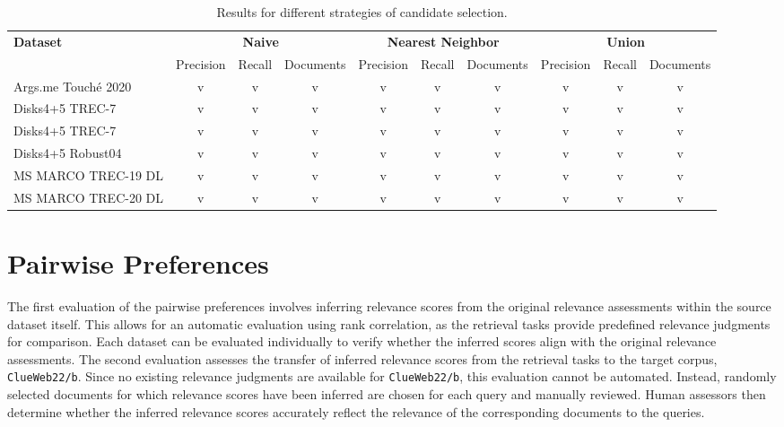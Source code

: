 \begin{sidewaystable}
    \centering
    \footnotesize
    \caption{Results for different strategies of candidate selection.}
    \begin{tabular}{lccccccccc}
        \toprule
        \textbf{Dataset} & \multicolumn{3}{c}{\textbf{Naive}} & \multicolumn{3}{c}{\textbf{Nearest Neighbor}} & \multicolumn{3}{c}{\textbf{Union}} \\
        \cmidrule(lr){2-4} \cmidrule(lr){5-7} \cmidrule(lr){8-10}
                         & Precision & Recall & Documents & Precision & Recall & Documents & Precision & Recall & Documents \\
        \midrule

        Args.me Touché 2020 & v & v & v & v & v & v & v & v & v \\
        Disks4+5 TREC-7     & v & v & v & v & v & v & v & v & v \\
        Disks4+5 TREC-7     & v & v & v & v & v & v & v & v & v \\
        Disks4+5 Robust04   & v & v & v & v & v & v & v & v & v \\
        MS MARCO TREC-19 DL & v & v & v & v & v & v & v & v & v \\
        MS MARCO TREC-20 DL & v & v & v & v & v & v & v & v & v \\

        \bottomrule 
    \end{tabular}
\end{sidewaystable}

\section{Pairwise Preferences}\label{eval-pairwise-preferences}

The first evaluation of the pairwise preferences involves inferring relevance scores from the original relevance assessments within the source dataset itself. This allows for an automatic evaluation using rank correlation, as the retrieval tasks provide predefined relevance judgments for comparison. Each dataset can be evaluated individually to verify whether the inferred scores align with the original relevance assessments. The second evaluation assesses the transfer of inferred relevance scores from the retrieval tasks to the target corpus, \texttt{ClueWeb22/b}. Since no existing relevance judgments are available for \texttt{ClueWeb22/b}, this evaluation cannot be automated. Instead, randomly selected documents for which relevance scores have been inferred are chosen for each query and manually reviewed. Human assessors then determine whether the inferred relevance scores accurately reflect the relevance of the corresponding documents to the queries.

